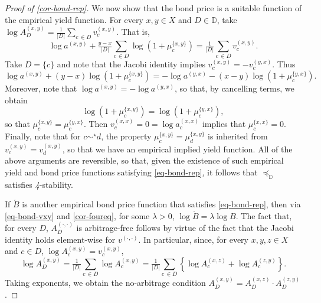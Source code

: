 \documentclass[ecta,nameyear,draft]{econsocart}
\newcommand{\mbbd}{{\mathds D}}
\newcommand{\xx}{(x,x)}
\newcommand{\xy}{{(x, y)}}
\newcommand{\yx}{{(y, x)}}
\newcommand{\zy}{{(z,y)}}
\newcommand{\xz}{{(x,z)}}
\newcommand{\dd}{{(\cdot,\cdot)}}
\newcommand{\stability}{\textit{4}-\textup{{stability}}}
\theoremstyle{plain}
\theoremstyle{remark}
\begin{document}
\begin{proof}[Proof of \cref{cor-bond-rep}]
  We now show that the bond price is a suitable function of the empirical yield
  function.  For every $x,y \in X$ and $D \in \mbbd$, take $\log {A}^{\xy}_{D}
  = \tfrac{1}{\lvert D\rvert}\sum_{c\,\in D}v^{\xy}_{c}$.  That is,
  \begin{equation*}
    \log a^{\xy} + \tfrac{y - x}{\lvert D\rvert} \sum_{c\,\in D}\log
    \left(1+\mu^{\{x,y\}}_{c}\right) = \tfrac{1}{\lvert D\rvert}\sum_{c\,\in D}
    v^{\xy}_{c}. 
  \end{equation*}
  Take $D = \{c\}$ and note that the Jacobi identity implies $v^{\xy}_c = -
  v^{\yx}_c$. Thus
  \begin{equation*}
    \log a^{\xy} + (y - x) \log \left(1+\mu^{\{x,y\}}_{c}\right)
    = -\log a^{\yx} - (x - y) \log \left(1+\mu^{\{y,x\}}_{c}\right).
  \end{equation*}
  Moreover, note that $\log a^{\xy} = -\log a^{\yx}$, so that, by cancelling
  terms, we obtain
  \begin{equation}\label{eq-mu-sym}
    \log \left(1+\mu^{\{x,y\}}_{c}\right) = \log \left(1+\mu^{\{y,x\}}_{c}\right),
  \end{equation}
  so that $\mu^{\{x,y\}}_{c} = \mu^{\{y,x\}}_{c}$. Then $v^{\xx}_{c} = 0 = \log
  a^{\xx}_{c} $ implies that $\mu^{\{x,x\}}_{c} = 0$. Finally, note that for $c
  \sim^{\star} d$, the property $\mu^{\{x,y\}}_{c} = \mu^{\{x,y\}}_{d}$ is
  inherited from $v^{\xy}_{c} = v^{\xy}_{d}$, so that we have an empirical
  implied yield function. All of the above arguments are reversible, so that,
  given the existence of such empirical yield and bond price functions
  satisfying \eqref{eq-bond-rep}, it follows that $\preceq_{\mbbd}$ satisfies
  \stability.

  If $\acute{B}$ is another empirical bond price function that satisfies
  \eqref{eq-bond-rep}, then via \cref{eq-bond-vxy} and \cref{cor-foureq}, for
  some $\lambda >0$, $\log \acute{B} = \lambda \log B$.  The fact that, for every
  $D$, ${A}^{\dd}_{D}$ is arbitrage-free follows by virtue of the fact that the
  Jacobi identity holds element-wise for $v^{\dd}$.  In particular, since, for
  every $x, y , z \in X$ and $c \in D$, $\log {A}^{\xy}_{c} = v^{\xy}_{c}$, 
  \begin{equation*}
    \log {A}^{\xy}_{D} = \tfrac{1}{\lvert D\rvert}\sum_{c\,\in D}\log
    {A}^{\xy}_c
    = \tfrac{1}{\lvert D\rvert}\sum_{c\,\in D} \left\{\log {A}^{\xz}_c + \log
    {A}^{\zy}_c \right\}.
  \end{equation*} 
  Taking exponents, we obtain the no-arbitrage condition ${A}^{\xy}_{D} =
  {A}^{\xz}_{D} \cdot {A}^{\zy}_{D}$.
\end{proof}
\end{document}
